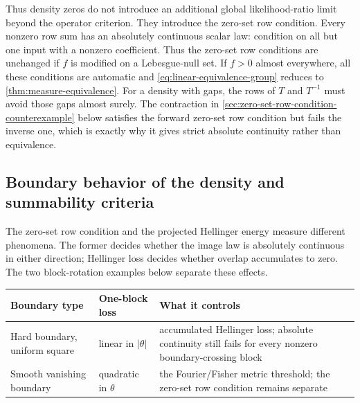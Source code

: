 Thus density zeros do not introduce an additional global likelihood-ratio
limit beyond the operator criterion.
They introduce the zero-set row condition.
Every nonzero row sum has an absolutely continuous scalar law: condition
on all but one input with a nonzero coefficient.  Thus the zero-set row conditions
are unchanged if $f$ is modified on a Lebesgue-null set.
If $f>0$ almost everywhere, all these conditions are automatic and
\eqref{eq:linear-equivalence-group} reduces to
\cref{thm:measure-equivalence}.
For a density with gaps, the rows of $T$ and $T^{-1}$ must avoid those
gaps almost surely.  The contraction in
\cref{sec:zero-set-row-condition-counterexample} below satisfies the forward
zero-set row condition but fails the inverse one, which is exactly why it gives
strict absolute continuity rather than equivalence.

\subsection{Boundary behavior of the density and summability criteria}
\label{sec:boundary-behavior-and-summability}

The zero-set row condition and the projected Hellinger energy measure different
phenomena.  The former decides whether the image law is absolutely
continuous in either direction; Hellinger loss decides whether overlap
accumulates to zero.
The two block-rotation examples below separate these effects.

\begin{center}
\renewcommand{\arraystretch}{1.15}
\begin{tabular}{p{} p{} p{}}
\toprule
\textbf{Boundary type} & \textbf{One-block loss} & \textbf{What it controls}\\
\midrule
Hard boundary, uniform square & linear in \(|\theta|\) & accumulated
Hellinger loss; absolute continuity still fails for every nonzero
boundary-crossing block\\
Smooth vanishing boundary & quadratic in \(\theta\) & the Fourier/Fisher
metric threshold; the zero-set row condition remains separate\\
\bottomrule
\end{tabular}
\end{center}

